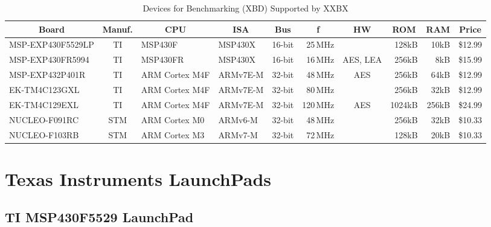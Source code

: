 \documentclass[twoside,11pt]{cergdoc}
\newcommand\thead[1]{\multicolumn{1}{c}{\textbf{#1}}}
\newcommand\theadr[1]{\multicolumn{1}{c|}{\textbf{#1}}}
\begin{document}
\begin{table}[ht]
    \centering%
    \caption{Devices for Benchmarking (XBD) Supported by XXBX}\label{tab:xbd}
    {\scriptsize\setlength{\tabcolsep}{3pt}
    \begin{tabular}{l|c|ll|rrc|rr|r}%
    \theadr{Board}   & \theadr{Manuf.} & \thead{CPU}&\theadr{ISA}& \thead{Bus} &\thead{f}&\theadr{HW}& \thead{ROM} & \theadr{RAM} &\thead{Price}\\ \hline
    MSP-EXP430F5529LP& TI        & MSP430F        &  MSP430X    & 16-bit &  25\,MHz &     &  128kB &  10kB &  \$12.99 \\
    MSP-EXP430FR5994 & TI        & MSP430FR       &  MSP430X    & 16-bit &  16\,MHz & AES, LEA &  256kB &   8kB &  \$15.99 \\
    MSP-EXP432P401R  & TI        & ARM Cortex M4F &  ARMv7E-M   & 32-bit &  48\,MHz & AES &  256kB &  64kB &  \$12.99 \\
    EK-TM4C123GXL    & TI        & ARM Cortex M4F &  ARMv7E-M   & 32-bit &  80\,MHz &     &  256kB &  32kB &  \$12.99 \\ 
    EK-TM4C129EXL    & TI        & ARM Cortex M4F &  ARMv7E-M   & 32-bit & 120\,MHz & AES & 1024kB & 256kB &  \$24.99 \\ 
    NUCLEO-F091RC    & STM       & ARM Cortex M0  &  ARMv6-M    & 32-bit &  48\,MHz &     &  256kB &  32kB &  \$10.33 \\
    NUCLEO-F103RB    & STM       & ARM Cortex M3  &  ARMv7-M    & 32-bit &  72\,MHz &     &  128kB &  20kB &  \$10.33 \\
    \end{tabular}%
    }\vspace{-2ex}%
\end{table}


\section{Texas Instruments LaunchPads}

\subsection{TI MSP430F5529 LaunchPad\texttrademark}
\end{document}
